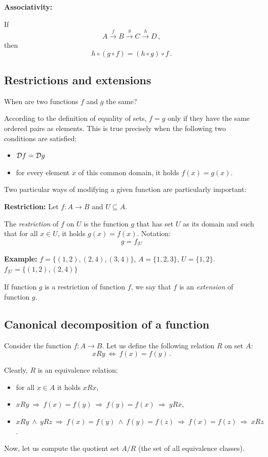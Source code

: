 \documentclass[11pt,paper=b5,footinclude,headinclude]{scrbook} %
\def\inn {{~\wedge~}}
\def\sledi {{~\Rightarrow~}}
\def\cee {{~\Leftrightarrow~}}
\theoremstyle{remark}
\theoremstyle{definition} %
\theoremstyle{theorem} %
\begin{document}
\textbf{ Associativity:}

If
$$A\overset{f}{\to} B\overset{g}{\to} C\overset{h}{\to} D\,,$$
then
$$h\circ (g\circ f) = (h\circ g)\circ f\,.$$

\subsection{Restrictions and extensions}
When are two functions $f$ and $g$ the same?

According to the definition of equality of sets, $f = g$ only if they have the same ordered pairs as elements.
This is true precisely when the following two conditions are satisfied:
\begin{itemize}
  \item ${\cal D}f = {\cal D}g$
  \item for every element $x$ of this common domain, it holds $f(x) = g(x)$.
\end{itemize}

Two particular ways of modifying a given function are particularly important:

\textbf{ Restriction:}
Let $f:A\to B$ and $U\subseteq A$.

The {\em restriction} of $f$ on  $U$
is the function $g$ that has set $U$ as its domain and such that for all $x\in U$, it holds
$g(x) = f(x)$. Notation:
$$g = f_{|U}$$

\bigskip
\textbf{ Example:} $f = \{(1,2),(2,4),(3,4)\}$, $A = \{1,2,3\}$, $U =  \{1,2\}$.
$f_{|U} = \{(1,2),(2,4)\}$

\bigskip
If function $g$ is a restriction of function $f$, we say that $f$ is an {\em extension} of function $g$.

\subsection{Canonical decomposition of a function}
Consider the function $f:A{\to} B$.
Let us define the following relation $R$ on set $A$:
$$xRy \cee f(x) = f(y)\,.$$

Clearly, $R$ is an equivalence relation:
\begin{itemize}
  \item for all $x\in A$ it holds $xRx$,
  \item $xRy \sledi f(x) = f(y) \sledi f(y) = f(x) \sledi yRx$,
  \item $xRy \inn yRz \sledi f(x) = f(y) \inn f(y) = f(z) \sledi f(x) = f(z) \sledi xRz$.
\end{itemize}
Now, let us compute the quotient set $A/R$ (the set of all equivalence classes).
\end{document}
